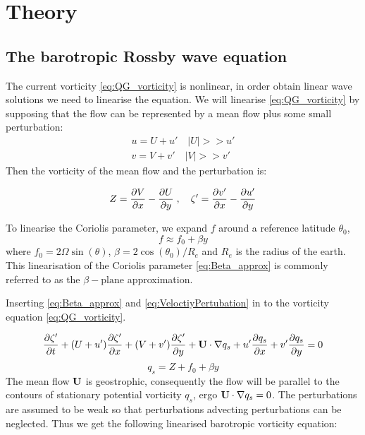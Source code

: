 \section{Theory}
\subsection{The barotropic Rossby wave equation}
The current vorticity \cref{eq:QG_vorticity} is
 nonlinear, in order obtain linear wave solutions we need to
linearise the equation. We will linearise \cref{eq:QG_vorticity} by supposing
that the flow can be represented by a mean flow plus some small perturbation:
\begin{equation}\label{eq:VeloctiyPertubation}
    \begin{split}
    u = U + u' \quad  |U| >> u' \\
    v = V + v' \quad  |V| >> v'
    \end{split}
\end{equation}
Then the vorticity of the mean flow and the perturbation is:

\begin{equation}\label{eq:VortPertubation}
    Z = \pdv{V}{x} - \pdv{U}{y} \; , \quad \zeta' = \pdv{v'}{x} - \pdv{u'}{y}
\end{equation}

To linearise the Coriolis parameter, we expand $f$
around a reference latitude $\theta_0$,
\begin{equation}\label{eq:Beta_approx}
    f \approx f_0 + \beta y
\end{equation}
where $f_0 = 2\Omega \sin(\theta)$, $\beta = 2\cos (\theta_0)/R_e$ and $R_e$ is
the radius of the earth. This linearisation of the Coriolis parameter
\cref{eq:Beta_approx} is commonly referred to as the $\beta-\mathrm{plane}$
approximation.

Inserting  \cref{eq:Beta_approx} and \cref{eq:VeloctiyPertubation} in to the
vorticity equation \cref{eq:QG_vorticity}.

\begin{equation}
    \pdv{\zeta'}{t} + (U+u')\pdv{\zeta'}{x} + (V+v')\pdv{\zeta'}{y} + \mathbf{U}
    \cdot \nabla q_s + u' \pdv{q_s}{x} + v' \pdv{q_s}{y} = 0
\end{equation}
\begin{equation}\label{eq:q_s}
    q_s = Z + f_0 + \beta y
\end{equation}
The mean flow $\mathbf{U}$ is geostrophic, consequently the flow will be parallel
to the contours of stationary potential vorticity $q_s$, ergo $\mathbf{U} \cdot
\nabla q_s = 0$. The perturbations are assumed to be weak so that perturbations
advecting perturbations can be neglected. Thus we get the following linearised
barotropic vorticity equation:

